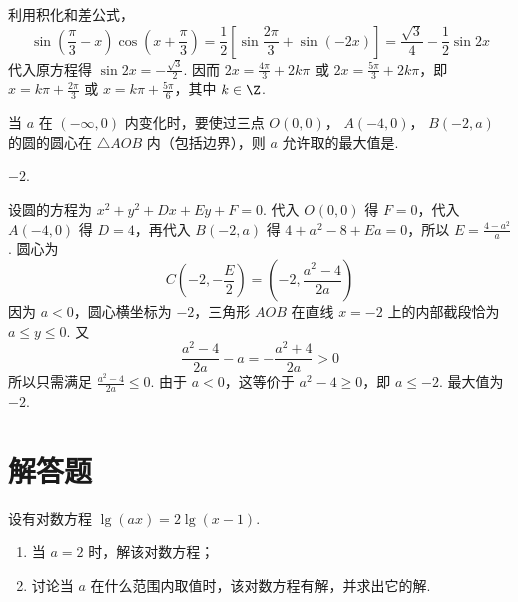 \begin{solution}
利用积化和差公式，
\[
\sin\left(\frac{\pi}{3}-x\right)\cos\left(x+\frac{\pi}{3}\right)
=\frac12\left[\sin\frac{2\pi}{3}+\sin(-2x)\right]
=\frac{\sqrt3}{4}-\frac12\sin2x
\]
代入原方程得 \(\sin2x=-\frac{\sqrt3}{2}\). 因而 \(2x=\frac{4\pi}{3}+2k\pi\) 或 \(2x=\frac{5\pi}{3}+2k\pi\)，即 \(x=k\pi+\frac{2\pi}{3}\) 或 \(x=k\pi+\frac{5\pi}{6}\)，其中 \(k\in\Z\).
\end{solution}

\begin{problem}

当 \(a \) 在 \((-\infty, 0) \) 内变化时，要使过三点 \(O(0, 0) \)， \(A(-4, 0) \)， \(B(-2, a) \) 的圆的圆心在 \(\triangle AOB \) 内（包括边界），则 \(a \) 允许取的最大值是\fillinblank{}.
\end{problem}

\begin{answer}
\(-2\).
\end{answer}

\begin{solution}
设圆的方程为 \(x^2+y^2+Dx+Ey+F=0\). 代入 \(O(0,0)\) 得 \(F=0\)，代入 \(A(-4,0)\) 得 \(D=4\)，再代入 \(B(-2,a)\) 得 \(4+a^2-8+Ea=0\)，所以 \(E=\frac{4-a^2}{a}\). 圆心为
\[
C\left(-2,-\frac E2\right)=\left(-2,\frac{a^2-4}{2a}\right)
\]
因为 \(a<0\)，圆心横坐标为 \(-2\)，三角形 \(AOB\) 在直线 \(x=-2\) 上的内部截段恰为 \(a\leq y\leq0\). 又
\[
\frac{a^2-4}{2a}-a=-\frac{a^2+4}{2a}>0
\]
所以只需满足 \(\frac{a^2-4}{2a}\leq0\). 由于 \(a<0\)，这等价于 \(a^2-4\geq0\)，即 \(a\leq-2\). 最大值为 \(-2\).
\end{solution}

\section{解答题}

\begin{problem}

设有对数方程 \(\lg(ax)=2\lg(x-1)\).

\begin{enumerate}
\item 当 \(a = 2\) 时，解该对数方程；
\item 讨论当 \(a\) 在什么范围内取值时，该对数方程有解，并求出它的解.
\end{enumerate}
\end{problem}

